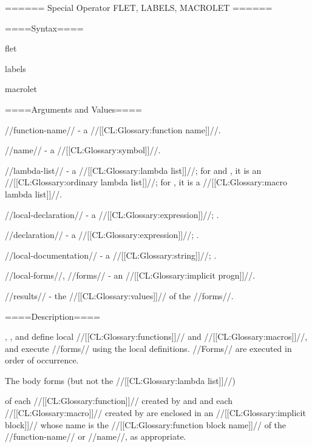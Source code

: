 ====== Special Operator FLET, LABELS, MACROLET ======

====Syntax====

\DefspecWithValuesNewline flet {} {}

\DefspecWithValuesNewline labels {} {}

\DefspecWithValuesNewline macrolet {} {}

====Arguments and Values====

//function-name// - a //[[CL:Glossary:function name]]//.

//name// - a //[[CL:Glossary:symbol]]//.

//lambda-list// - a //[[CL:Glossary:lambda list]]//; for  and , it is an //[[CL:Glossary:ordinary lambda list]]//; for , it is a //[[CL:Glossary:macro lambda list]]//.

//local-declaration// - a  //[[CL:Glossary:expression]]//; \noeval.

//declaration// - a  //[[CL:Glossary:expression]]//; \noeval.

//local-documentation// - a //[[CL:Glossary:string]]//; \noeval.

//local-forms//, //forms// - an //[[CL:Glossary:implicit progn]]//.

//results// - the //[[CL:Glossary:values]]// of the //forms//.

====Description====

, , and  define local //[[CL:Glossary:functions]]// and //[[CL:Glossary:macros]]//, and execute //forms// using the local definitions. //Forms// are executed in order of occurrence.

The body forms (but not the //[[CL:Glossary:lambda list]]//)

of each //[[CL:Glossary:function]]// created by  and  and each //[[CL:Glossary:macro]]// created by  are enclosed in an //[[CL:Glossary:implicit block]]// whose name is the //[[CL:Glossary:function block name]]// of the //function-name// or //name//, as appropriate.

